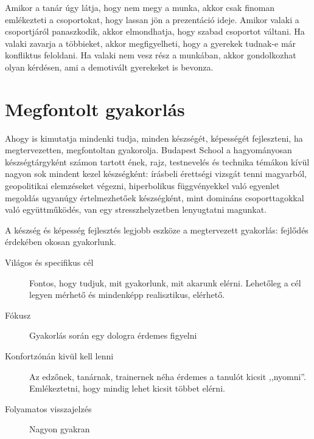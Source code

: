 Amikor a tanár úgy látja, hogy nem megy a munka, akkor csak finoman emlékezteti a csoportokat, hogy lassan jön a prezentáció ideje. Amikor valaki a csoportjáról panaszkodik, akkor elmondhatja, hogy szabad csoportot váltani. Ha valaki zavarja a többieket, akkor megfigyelheti, hogy a gyerekek tudnak-e már konfliktus feloldani. Ha valaki nem vesz rész a munkában, akkor gondolkozhat olyan kérdésen, ami a demotivált gyerekeket is bevonza.

\section{Megfontolt gyakorlás}
Ahogy  is kimutatja mindenki tudja, minden készségét, képességét fejleszteni, ha megtervezetten, megfontoltan gyakorolja. Budapest School a hagyományosan készségtárgyként számon tartott ének, rajz, testnevelés és technika témákon kívül nagyon sok mindent kezel készségként: írásbeli érettségi vizsgát tenni magyarból, geopolitikai elemzéseket végezni, hiperbolikus függvényekkel való egyenlet megoldás ugyanúgy értelmezhetőek készségként, mint domináns csoporttagokkal való együttműködés, van egy stresszhelyzetben lenyugtatni magunkat.

A készség és képesség fejlesztés legjobb eszköze a megtervezett gyakorlás: fejlődés érdekében okosan gyakorlunk.

\begin{description}
  \item[Világos és specifikus cél] Fontos, hogy tudjuk, mit gyakorlunk, mit akarunk elérni.  Lehetőleg a cél legyen mérhető és mindenképp realisztikus, elérhető.
  \item[Fókusz] Gyakorlás során egy dologra érdemes figyelni
  \item[Konfortzónán kivül kell lenni] Az edzőnek, tanárnak, trainernek néha érdemes a tanulót kicsit ,,nyomni''. Emlékeztetni, hogy mindig lehet kicsit többet elérni.
  \item[Folyamatos visszajelzés] Nagyon gyakran
\end{description}

